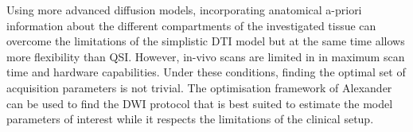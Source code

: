 Using more advanced diffusion models, incorporating anatomical a-priori information about the different compartments of the investigated tissue can overcome the limitations of the simplistic DTI model but at the same time allows more flexibility than QSI. However, in-vivo scans are limited in in maximum scan time and hardware capabilities. Under these conditions, finding the optimal set of acquisition parameters is not trivial. The optimisation framework of Alexander can be used to find the DWI protocol that is best suited to estimate the model parameters of interest while it respects the limitations of the clinical setup.  
